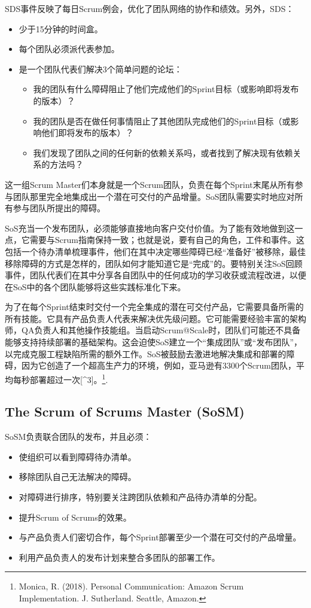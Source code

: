 \documentclass[12pt,a4paper,parskip=full]{scrartcl}
\begin{document}
\begin{CJK*}{UTF8}{gbsn}
SDS事件反映了每日Scrum例会，优化了团队网络的协作和绩效。另外，SDS：

\begin{itemize}
\item 少于15分钟的时间盒。
\item 每个团队必须派代表参加。
\item 是一个团队代表们解决3个简单问题的论坛：
\begin{itemize}
\item 我的团队有什么障碍阻止了他们完成他们的Sprint目标（或影响即将发布的版本）？
\item 我的团队是否在做任何事情阻止了其他团队完成他们的Sprint目标（或影响他们即将发布的版本）？
\item 我们发现了团队之间的任何新的依赖关系吗，或者找到了解决现有依赖关系的方法吗？
\end{itemize}
\end{itemize}

这一组Scrum Master们本身就是一个Scrum团队，负责在每个Sprint末尾从所有参与团队那里完全地集成出一个潜在可交付的产品增量。SoS团队需要实时地应对所有参与团队所提出的障碍。

SoS充当一个发布团队，必须能够直接地向客户交付价值。为了能有效地做到这一点，它需要与Scrum指南保持一致；也就是说，要有自己的角色，工件和事件。这包括一个待办清单梳理事件，他们在其中决定哪些障碍已经“准备好”被移除，最佳移除障碍的方式是怎样的，团队如何才能知道它是“完成”的。要特别关注SoS回顾事件，团队代表们在其中分享各自团队中的任何成功的学习收获或流程改进，以便在SoS中的各个团队能够将这些实践标准化下来。

为了在每个Sprint结束时交付一个完全集成的潜在可交付产品，它需要具备所需的所有技能。它具有产品负责人代表来解决优先级问题。它可能需要经验丰富的架构师，QA负责人和其他操作技能组。当启动Scrum@Scale时，团队们可能还不具备能够支持持续部署的基础架构。这会迫使SoS建立一个“集成团队”或“发布团队”，以完成克服工程缺陷所需的额外工作。SoS被鼓励去激进地解决集成和部署的障碍，因为它创造了一个超高生产力的环境，例如，亚马逊有3300个Scrum团队，平均每秒部署超过一次[^3]。\footnote{Monica, R. (2018). Personal
Communication: Amazon Scrum Implementation. J. Sutherland. Seattle,
Amazon.}.

\subsection{The Scrum of Scrums Master (SoSM)}
SoSM负责联合团队的发布，并且必须：
\begin{itemize}
\item 使组织可以看到障碍待办清单。
\item 移除团队自己无法解决的障碍。
\item 对障碍进行排序，特别要关注跨团队依赖和产品待办清单的分配。
\item 提升Scrum of Scrums的效果。
\item 与产品负责人们密切合作，每个Sprint部署至少一个潜在可交付的产品增量。
\item 利用产品负责人的发布计划来整合多团队的部署工作。
\end{itemize}


\end{CJK*}
\end{document}
